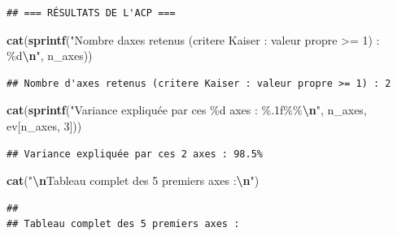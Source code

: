\documentclass[
]{article}
\newenvironment{Shaded}{\begin{snugshade}}{\end{snugshade}}
\newcommand{\DecValTok}[1]{\textcolor[rgb]{0.00,0.00,0.81}{#1}}
\newcommand{\FunctionTok}[1]{\textcolor[rgb]{0.13,0.29,0.53}{\textbf{#1}}}
\newcommand{\NormalTok}[1]{#1}
\newcommand{\SpecialCharTok}[1]{\textcolor[rgb]{0.81,0.36,0.00}{\textbf{#1}}}
\newcommand{\StringTok}[1]{\textcolor[rgb]{0.31,0.60,0.02}{#1}}
\begin{document}
\begin{verbatim}
## === RÉSULTATS DE L'ACP ===
\end{verbatim}

\begin{Shaded}
\begin{Highlighting}[]
\FunctionTok{cat}\NormalTok{(}\FunctionTok{sprintf}\NormalTok{(}\StringTok{"Nombre d\textquotesingle{}axes retenus (critere Kaiser : valeur propre \textgreater{}= 1) : \%d}\SpecialCharTok{\textbackslash{}n}\StringTok{"}\NormalTok{, n\_axes))}
\end{Highlighting}
\end{Shaded}

\begin{verbatim}
## Nombre d'axes retenus (critere Kaiser : valeur propre >= 1) : 2
\end{verbatim}

\begin{Shaded}
\begin{Highlighting}[]
\FunctionTok{cat}\NormalTok{(}\FunctionTok{sprintf}\NormalTok{(}\StringTok{"Variance expliquée par ces \%d axes : \%.1f\%\%}\SpecialCharTok{\textbackslash{}n}\StringTok{"}\NormalTok{, n\_axes, ev[n\_axes, }\DecValTok{3}\NormalTok{]))}
\end{Highlighting}
\end{Shaded}

\begin{verbatim}
## Variance expliquée par ces 2 axes : 98.5%
\end{verbatim}

\begin{Shaded}
\begin{Highlighting}[]
\FunctionTok{cat}\NormalTok{(}\StringTok{"}\SpecialCharTok{\textbackslash{}n}\StringTok{Tableau complet des 5 premiers axes :}\SpecialCharTok{\textbackslash{}n}\StringTok{"}\NormalTok{)}
\end{Highlighting}
\end{Shaded}

\begin{verbatim}
## 
## Tableau complet des 5 premiers axes :
\end{verbatim}
\end{document}
